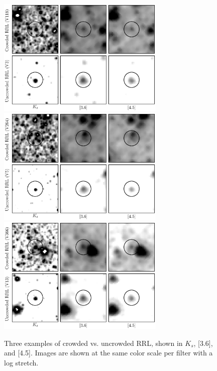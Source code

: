 \documentclass[a4paper,fleqn,usenatbib]{mnras}
\begin{document}
\begin{figure}
\begin{center}
\includegraphics[width=80mm]{../ocen_only_fitting/final_plots/crowding_example_3_118.eps}
\includegraphics[width=80mm]{../ocen_only_fitting/final_plots/crowding_example_5_264.eps}
\includegraphics[width=80mm]{../ocen_only_fitting/final_plots/crowding_example_13_366.eps}
\caption{Three examples of crowded vs. uncrowded RRL, shown in $K_s$, [3.6], and [4.5]. Images are shown at the same color scale per filter with a log stretch.} 
\label{fig:crowding}
\end{center}
\end{figure}

\end{document}
